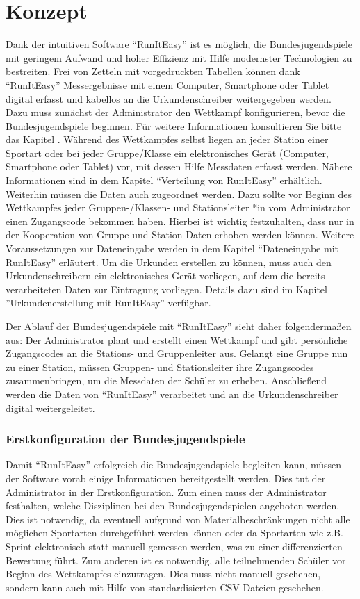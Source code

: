 \documentclass[11pt,a4paper,titlepage,german]{article}
\begin{document}
	\part{Konzept}
		Dank der intuitiven Software “RunItEasy” ist es möglich, die Bundesjugendspiele mit geringem Aufwand und hoher Effizienz mit Hilfe modernster Technologien zu bestreiten.
		Frei von Zetteln mit vorgedruckten Tabellen können dank “RunItEasy” Messergebnisse mit einem Computer, Smartphone oder Tablet digital erfasst und kabellos an die Urkundenschreiber weitergegeben werden. 
		Dazu muss zunächst der Administrator den Wettkampf konfigurieren, bevor die Bundesjugendspiele beginnen. Für weitere Informationen konsultieren Sie bitte das Kapitel .
		Während des Wettkampfes selbst liegen an jeder Station einer Sportart oder bei jeder Gruppe/Klasse ein elektronisches Gerät (Computer, Smartphone oder Tablet) vor, mit dessen Hilfe Messdaten erfasst werden. Nähere Informationen sind in dem Kapitel “Verteilung von RunItEasy” erhältlich.
		Weiterhin müssen die Daten auch zugeordnet werden. Dazu sollte vor Beginn des Wettkampfes jeder Gruppen-/Klassen- und Stationsleiter *in vom Administrator einen Zugangscode bekommen haben. Hierbei ist wichtig festzuhalten, dass nur in der Kooperation von Gruppe und Station Daten erhoben werden können. Weitere Voraussetzungen zur Dateneingabe werden in dem Kapitel “Dateneingabe mit RunItEasy” erläutert. 
		Um die Urkunden erstellen zu können, muss auch den Urkundenschreibern ein elektronisches Gerät vorliegen, auf dem die bereits verarbeiteten Daten zur Eintragung vorliegen. Details dazu sind im Kapitel ”Urkundenerstellung mit RunItEasy” verfügbar.
		
		Der Ablauf der Bundesjugendspiele mit “RunItEasy” sieht daher folgendermaßen aus:
		Der Administrator plant und erstellt einen Wettkampf und gibt persönliche Zugangscodes an die Stations- und Gruppenleiter aus. Gelangt eine Gruppe nun zu einer Station, müssen Gruppen- und Stationsleiter ihre Zugangscodes zusammenbringen, um die Messdaten der Schüler zu erheben. Anschließend werden die Daten von “RunItEasy” verarbeitet und an die Urkundenschreiber digital weitergeleitet.
		
		\section[Konfiguration]{Erstkonfiguration der Bundesjugendspiele}
			\label{concept:initialConfig}
			Damit “RunItEasy” erfolgreich die Bundesjugendspiele begleiten kann, müssen der Software vorab einige Informationen bereitgestellt werden. Dies tut der Administrator in der Erstkonfiguration. 
			Zum einen muss der Administrator festhalten, welche Disziplinen bei den Bundesjugendspielen angeboten werden. Dies ist notwendig, da eventuell aufgrund von Materialbeschränkungen nicht alle möglichen Sportarten durchgeführt werden können oder da Sportarten wie z.B. Sprint elektronisch statt manuell gemessen werden, was zu einer differenzierten Bewertung führt.
			Zum anderen ist es notwendig, alle teilnehmenden Schüler vor Beginn des Wettkampfes einzutragen. Dies muss nicht manuell geschehen, sondern kann auch mit Hilfe von standardisierten CSV-Dateien geschehen.
			
\end{document}
